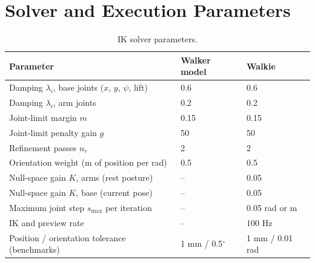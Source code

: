 \section{Solver and Execution Parameters}
\label{app:params}

\begin{table}[H]
    \centering
    \small
    \begin{tabular}{lll}
        \toprule
        Parameter & Walker model & Walkie \\
        \midrule
        Damping $\lambda_i$, base joints ($x$, $y$, $\psi$, lift) & 0.6 & 0.6 \\
        Damping $\lambda_i$, arm joints & 0.2 & 0.2 \\
        Joint-limit margin $m$ & 0.15 & 0.15 \\
        Joint-limit penalty gain $g$ & 50 & 50 \\
        Refinement passes $n_r$ & 2 & 2 \\
        Orientation weight (m of position per rad) & 0.5 & 0.5 \\
        Null-space gain $K$, arms (rest posture) & -- & 0.05 \\
        Null-space gain $K$, base (current pose) & -- & 0.05 \\
        Maximum joint step $s_{\max}$ per iteration & -- & 0.05 rad or m \\
        IK and preview rate & -- & 100 Hz \\
        Position / orientation tolerance (benchmarks) & 1 mm / 0.5$^\circ$ & 1 mm / 0.01 rad \\
        \bottomrule
    \end{tabular}
    \caption{\small{IK solver parameters.}}
    \label{tab:app_ik_params}
\end{table}

